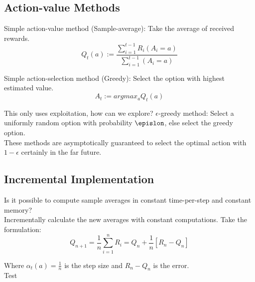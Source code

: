 \documentclass[a4paper]{article}
\begin{document}
\subsection{Action-value Methods}
Simple action-value method (Sample-average): Take the average of received rewards. $$Q_t(a) := \frac{\sum_{i=1}^{t-1}R_i(A_i = a)}{\sum_{i=1}^{t-1}(A_i = a)}$$

Simple action-selection method (Greedy): Select the option with highest estimated value. $$A_t := argmax_aQ_t(a)$$

This only uses exploitation, how can we explore? $\epsilon$-greedy method: Select a uniformly random option with probability $\epislon$, else select the greedy option.\\
These methods are asymptotically guaranteed to select the optimal action with $1 - \epsilon$ certainly in the far future.

\subsection{Incremental Implementation}
Is it possible to compute sample averages in constant time-per-step and constant memory?\\

Incrementally calculate the new averages with constant computations. Take the formulation: $$Q_{n+1} = \frac{1}{n}\sum_{i=1}^nR_i = Q_n + \frac{1}{n}[R_n - Q_n]$$

Where $\alpha_t(a) = \frac{1}{n}$ is the step size and $R_n - Q_n$ is the error.\\

Test
\end{document}
